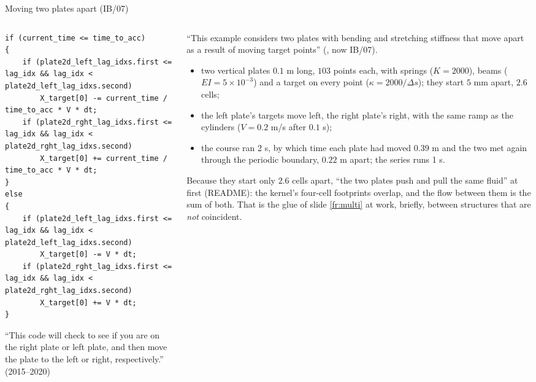 \documentclass[aspectratio=169,11pt]{beamer}
\begin{document}
\begin{frame}[fragile]{Moving two plates apart (IB/07)}
\label{fr:plates}
\begin{columns}[T,onlytextwidth]
\begin{column}{0.5\textwidth}
\begin{lstlisting}[style=cpptiny]
if (current_time <= time_to_acc)
{
    if (plate2d_left_lag_idxs.first <= lag_idx && lag_idx < plate2d_left_lag_idxs.second)
        X_target[0] -= current_time / time_to_acc * V * dt;
    if (plate2d_rght_lag_idxs.first <= lag_idx && lag_idx < plate2d_rght_lag_idxs.second)
        X_target[0] += current_time / time_to_acc * V * dt;
}
else
{
    if (plate2d_left_lag_idxs.first <= lag_idx && lag_idx < plate2d_left_lag_idxs.second)
        X_target[0] -= V * dt;
    if (plate2d_rght_lag_idxs.first <= lag_idx && lag_idx < plate2d_rght_lag_idxs.second)
        X_target[0] += V * dt;
}
\end{lstlisting}
\footnotesize ``This code will check to see if you are on the right plate or left plate, and then move the plate to the left or right, respectively.'' (2015--2020)
\end{column}
\begin{column}{0.48\textwidth}
\scriptsize ``This example considers two plates with bending and stretching stiffness that move apart as a result of moving target points'' (, now IB/07).
\begin{itemize}
  \item two vertical plates $0.1$ m long, $103$ points each, with springs ($K = 2000$), beams ($EI = 5\times10^{-3}$) and a target on every point ($\kappa = 2000/\Delta s$); they start $5$ mm apart, $2.6$ cells;
  \item the left plate's targets move left, the right plate's right, with the same ramp as the cylinders ($V = 0.2$ m/s after $0.1$ s);
  \item the course ran 2 s, by which time each plate had moved $0.39$ m and the two met again through the periodic boundary, $0.22$ m apart; the series runs 1 s.
\end{itemize}
\scriptsize Because they start only $2.6$ cells apart, ``the two plates push and pull the same fluid'' at first (README): the kernel's four-cell footprints overlap, and the flow between them is the sum of both. That is the glue of slide \ref{fr:multi} at work, briefly, between structures that are \emph{not} coincident.
\end{column}
\end{columns}
\end{frame}
\end{document}
